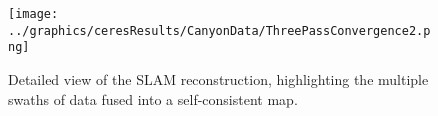  \begin{figure}[htbp]
   \centering
   \texttt{[image: ../graphics/ceresResults/CanyonData/ThreePassConvergence2.png]} %
   \caption{Detailed view of the SLAM reconstruction, highlighting the multiple swaths of data fused into a self-consistent map. }
   \label{fig:RealDataSolution2}
\end{figure}